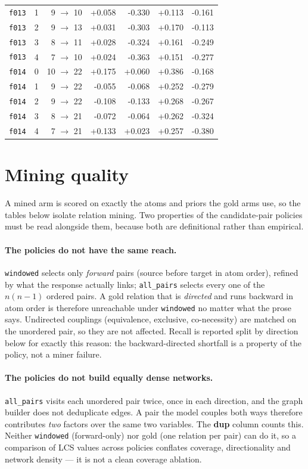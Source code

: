 \documentclass[11pt]{article}
\begin{document}
\begin{table}[htbp]
\begin{tabular}{llrrrrr}
\texttt{f013} & 1 & 9 $\to$ 10 & +0.058 & -0.330 & +0.113 & -0.161 \\
\texttt{f013} & 2 & 9 $\to$ 13 & +0.031 & -0.303 & +0.170 & -0.113 \\
\texttt{f013} & 3 & 8 $\to$ 11 & +0.028 & -0.324 & +0.161 & -0.249 \\
\texttt{f013} & 4 & 7 $\to$ 10 & +0.024 & -0.363 & +0.151 & -0.277 \\
\texttt{f014} & 0 & 10 $\to$ 22 & +0.175 & +0.060 & +0.386 & -0.168 \\
\texttt{f014} & 1 & 9 $\to$ 22 & -0.055 & -0.068 & +0.252 & -0.279 \\
\texttt{f014} & 2 & 9 $\to$ 22 & -0.108 & -0.133 & +0.268 & -0.267 \\
\texttt{f014} & 3 & 8 $\to$ 21 & -0.072 & -0.064 & +0.262 & -0.324 \\
\texttt{f014} & 4 & 7 $\to$ 21 & +0.133 & +0.023 & +0.257 & -0.380 \\
\bottomrule
\end{tabular}
\end{table}

\section{Mining quality}\label{sec:mining}

A mined arm is scored on exactly the atoms and priors the gold arms use, so the tables below isolate relation mining. Two properties of the candidate-pair policies must be read alongside them, because both are definitional rather than empirical.

\paragraph{The policies do not have the same reach.} \texttt{windowed} selects only \emph{forward} pairs (source before target in atom order), refined by what the response actually links; \texttt{all\_pairs} selects every one of the $n(n-1)$ ordered pairs. A gold relation that is \emph{directed} and runs backward in atom order is therefore unreachable under \texttt{windowed} no matter what the prose says. Undirected couplings (equivalence, exclusive, co-necessity) are matched on the unordered pair, so they are not affected. Recall is reported split by direction below for exactly this reason: the backward-directed shortfall is a property of the policy, not a miner failure.

\paragraph{The policies do not build equally dense networks.} \texttt{all\_pairs} visits each unordered pair twice, once in each direction, and the graph builder does not deduplicate edges. A pair the model couples both ways therefore contributes \emph{two} factors over the same two variables. The \textbf{dup} column counts this. Neither \texttt{windowed} (forward-only) nor gold (one relation per pair) can do it, so a comparison of LCS values across policies conflates coverage, directionality and network density --- it is not a clean coverage ablation.
\end{document}
